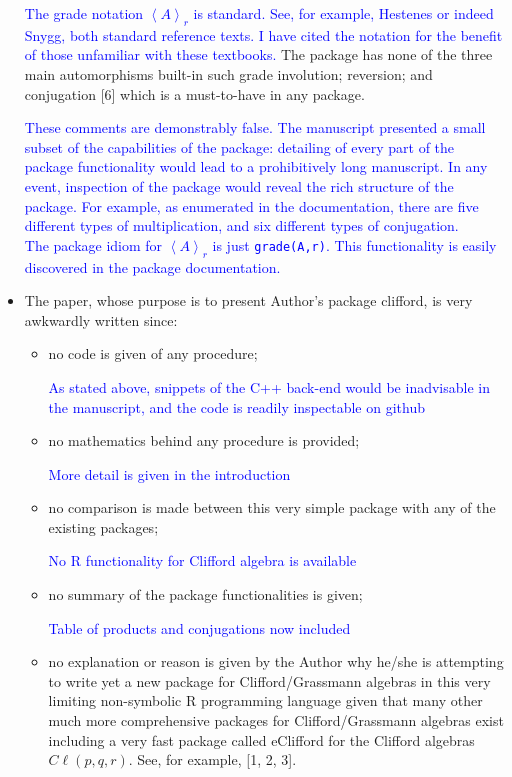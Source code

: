\documentclass{article}
\newcommand{\cliff}[1]{\ensuremath{C\ell\left(#1\right)}}
\begin{document}
\begin{itemize}
{  \textcolor{blue}{The grade notation $\left\langle A\right\rangle_r$
    is standard.  See, for example, Hestenes or indeed Snygg, both
    standard reference texts.  I have cited the notation for the
    benefit of those unfamiliar with these textbooks.}}
 The package has none
  of the three main automorphisms built-in such grade involution;
  reversion; and conjugation [6] which is a must-to-have in any
  package.

\textcolor{blue}{These comments are demonstrably false.  The
  manuscript presented a small subset of the capabilities of the
  package: detailing of every part of the package functionality would
  lead to a prohibitively long manuscript.  In any event, inspection
  of the package would reveal the rich structure of the package.  For
  example, as enumerated in the documentation, there are five
  different types of multiplication, and six different types of
  conjugation.\\ The package idiom for $\left\langle A\right\rangle_r$
  is just {\tt grade(A,r)}. This functionality is easily discovered in
  the package documentation.}

\item The paper, whose purpose is to present Author’s package clifford, is very awkwardly written
since:

\begin{itemize}
\item no code is given of any procedure;

  \textcolor{blue}{As stated above, snippets of the C++ back-end would
    be inadvisable in the manuscript, and the code is readily
    inspectable on github}
\item  no mathematics behind any procedure is provided;

  \textcolor{blue}{More detail is given in the introduction}
\item no comparison is made between this very simple package with any of the existing packages;

  \textcolor{blue}{No R functionality for Clifford algebra is available}

\item  no summary of the package functionalities is given;

    \textcolor{blue}{Table of products and conjugations now included}

\item  no explanation or reason is given by the Author why he/she is attempting to write yet
a new package for Clifford/Grassmann algebras in this very limiting non-symbolic R
programming language given that many other much more comprehensive packages for
Clifford/Grassmann algebras exist including a very fast package called eClifford for
the Clifford algebras \cliff{p, q, r}. See, for example, [1, 2, 3].


\end{itemize}
\end{itemize}
\end{document}
